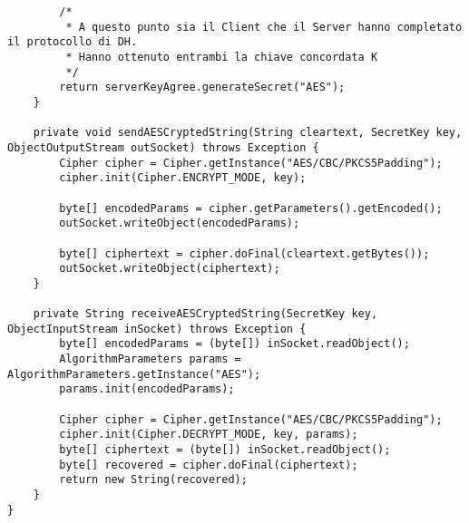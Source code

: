 \documentclass[12pt]{article}
\begin{document}
\begin{lstlisting}
		/*
		 * A questo punto sia il Client che il Server hanno completato il protocollo di DH.
		 * Hanno ottenuto entrambi la chiave concordata K
		 */
		return serverKeyAgree.generateSecret("AES");
	}

	private void sendAESCryptedString(String cleartext, SecretKey key, ObjectOutputStream outSocket) throws Exception {
		Cipher cipher = Cipher.getInstance("AES/CBC/PKCS5Padding");
		cipher.init(Cipher.ENCRYPT_MODE, key);

		byte[] encodedParams = cipher.getParameters().getEncoded();
		outSocket.writeObject(encodedParams);

		byte[] ciphertext = cipher.doFinal(cleartext.getBytes());
		outSocket.writeObject(ciphertext);
	}

	private String receiveAESCryptedString(SecretKey key, ObjectInputStream inSocket) throws Exception {
		byte[] encodedParams = (byte[]) inSocket.readObject();
		AlgorithmParameters params = AlgorithmParameters.getInstance("AES");
		params.init(encodedParams);

		Cipher cipher = Cipher.getInstance("AES/CBC/PKCS5Padding");
		cipher.init(Cipher.DECRYPT_MODE, key, params);
		byte[] ciphertext = (byte[]) inSocket.readObject();
		byte[] recovered = cipher.doFinal(ciphertext);
		return new String(recovered);
	}
}
\end{lstlisting}
\end{document}
